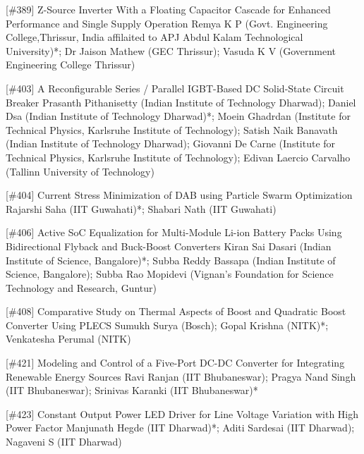 {} \begin{abstract_online} {[\#389] Z-Source Inverter With a Floating Capacitor Cascade for Enhanced Performance and Single Supply Operation} {} {Remya K P (Govt. Engineering College,Thrissur, India affilaited to  APJ Abdul Kalam Technological University)*; Dr Jaison Mathew (GEC Thrissur); Vasuda  K V (Government Engineering College Thrissur)} {}  \end{abstract_online} 
{} \begin{abstract_online} {[\#403] A Reconfigurable Series / Parallel IGBT-Based DC Solid-State Circuit Breaker} {} {Prasanth Pithanisetty (Indian Institute of Technology Dharwad); Daniel Dsa (Indian Institute of Technology Dharwad)*; Moein Ghadrdan (Institute for Technical Physics, Karlsruhe Institute of Technology); Satish Naik Banavath (Indian Institute of Technology Dharwad); Giovanni De Carne (Institute for Technical Physics, Karlsruhe Institute of Technology); Edivan Laercio Carvalho (Tallinn University of Technology)} {}  \end{abstract_online} 
{} \begin{abstract_online} {[\#404] Current Stress Minimization of DAB using Particle Swarm Optimization} {} {Rajarshi Saha (IIT Guwahati)*; Shabari Nath (IIT Guwahati)} {}  \end{abstract_online} 
{} \begin{abstract_online} {[\#406] Active SoC Equalization for Multi-Module Li-ion Battery Packs Using Bidirectional Flyback and Buck-Boost Converters} {} {Kiran Sai Dasari (Indian Institute of Science, Bangalore)*; Subba Reddy  Bassapa (Indian Institute of Science, Bangalore); Subba Rao Mopidevi (Vignan's Foundation for Science Technology and Research, Guntur)} {}  \end{abstract_online} 
{} \begin{abstract_online} {[\#408]  Comparative Study on Thermal Aspects of Boost and Quadratic Boost Converter Using PLECS} {} {Sumukh Surya (Bosch); Gopal Krishna (NITK)*; Venkatesha Perumal (NITK)} {}  \end{abstract_online} 
{} \begin{abstract_online} {[\#421] Modeling and Control of a Five-Port DC-DC Converter for Integrating Renewable Energy Sources} {} {Ravi Ranjan (IIT Bhubaneswar); Pragya Nand Singh (IIT Bhubaneswar); Srinivas  Karanki (IIT Bhubaneswar)*} {}  \end{abstract_online} 
{} \begin{abstract_online} {[\#423] Constant Output Power LED Driver for Line Voltage Variation with High Power Factor} {} {Manjunath Hegde (IIT Dharwad)*; Aditi Sardesai (IIT Dharwad); Nagaveni S (IIT Dharwad)} {}  \end{abstract_online} 
